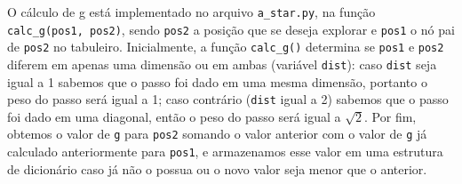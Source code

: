 \documentclass{article}
\begin{document}
O cálculo de g está implementado no arquivo \verb|a_star.py|, na função \verb|calc_g(pos1, pos2)|, sendo \verb|pos2| a posição que se deseja explorar e \verb|pos1| o nó pai de \verb|pos2| no tabuleiro. Inicialmente, a função \verb|calc_g()| determina se \verb|pos1| e \verb|pos2| diferem em apenas uma dimensão ou em ambas (variável \verb|dist|): caso \verb|dist| seja igual a 1 sabemos que o passo foi dado em uma mesma dimensão, portanto o peso do passo será igual a 1; caso contrário (\verb|dist| igual a 2) sabemos que o passo foi dado em uma diagonal, então o peso do passo será igual a \(\sqrt{2}\). Por fim, obtemos o valor de \verb|g| para \verb|pos2| somando o valor anterior com o valor de \verb|g| já calculado anteriormente para \verb|pos1|, e armazenamos esse valor em uma estrutura de dicionário caso já não o possua ou o novo valor seja menor que o anterior.\\
\end{document}
